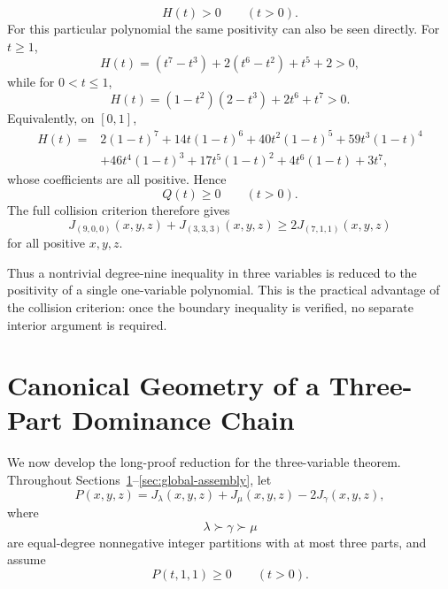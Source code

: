 \documentclass[11pt]{article}
\theoremstyle{definition}
\begin{document}
\begin{equation*}
H(t)>0
\qquad(t>0).
\end{equation*}
For this particular polynomial the same positivity can also be seen directly.  For \(t\ge1\),
\begin{equation*}
H(t)
=(t^7-t^3)+2(t^6-t^2)+t^5+2>0,
\end{equation*}
while for \(0<t\le1\),
\begin{equation*}
H(t)=(1-t^2)(2-t^3)+2t^6+t^7>0.
\end{equation*}
Equivalently, on \([0,1]\),
\begin{align*}
H(t)={}&2(1-t)^7+14t(1-t)^6+40t^2(1-t)^5+59t^3(1-t)^4\\
&+46t^4(1-t)^3+17t^5(1-t)^2+4t^6(1-t)+3t^7,
\end{align*}
whose coefficients are all positive.  Hence
\begin{equation*}
Q(t)\ge0
\qquad(t>0).
\end{equation*}
The full collision criterion therefore gives
\begin{equation*}
J_{(9,0,0)}(x,y,z)+J_{(3,3,3)}(x,y,z)
\ge
2J_{(7,1,1)}(x,y,z)
\end{equation*}
for all positive \(x,y,z\).

Thus a nontrivial degree-nine inequality in three variables is reduced to the positivity of a single one-variable polynomial.  This is the practical advantage of the collision criterion: once the boundary inequality is verified, no separate interior argument is required.




\section{Canonical Geometry of a Three-Part Dominance Chain}
\label{sec:canonical-geometry}

We now develop the long-proof reduction for the three-variable theorem. Throughout Sections~\ref{sec:canonical-geometry}--\ref{sec:global-assembly}, let
\begin{equation*}
P(x,y,z)
=
J_\lambda(x,y,z)+J_\mu(x,y,z)-2J_\gamma(x,y,z),
\end{equation*}
where
\begin{equation*}
\lambda\succ\gamma\succ\mu
\end{equation*}
are equal-degree nonnegative integer partitions with at most three parts, and assume
\begin{equation*}
P(t,1,1)\ge0
\qquad(t>0).
\end{equation*}
\end{document}
